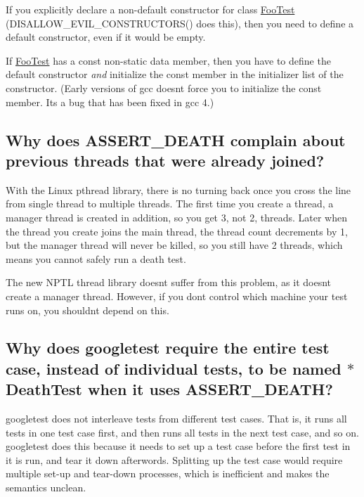 \begin{DoxyItemize}
\item If you explicitly declare a non-\/default constructor for class {\ttfamily \mbox{\hyperlink{class_foo_test}{Foo\+Test}}} ({\ttfamily D\+I\+S\+A\+L\+L\+O\+W\+\_\+\+E\+V\+I\+L\+\_\+\+C\+O\+N\+S\+T\+R\+U\+C\+T\+O\+R\+S()} does this), then you need to define a default constructor, even if it would be empty.
\item If {\ttfamily \mbox{\hyperlink{class_foo_test}{Foo\+Test}}} has a const non-\/static data member, then you have to define the default constructor {\itshape and} initialize the const member in the initializer list of the constructor. (Early versions of {\ttfamily gcc} doesn\textquotesingle{}t force you to initialize the const member. It\textquotesingle{}s a bug that has been fixed in {\ttfamily gcc 4}.)
\end{DoxyItemize}

\subsection*{Why does A\+S\+S\+E\+R\+T\+\_\+\+D\+E\+A\+TH complain about previous threads that were already joined?}

With the Linux pthread library, there is no turning back once you cross the line from single thread to multiple threads. The first time you create a thread, a manager thread is created in addition, so you get 3, not 2, threads. Later when the thread you create joins the main thread, the thread count decrements by 1, but the manager thread will never be killed, so you still have 2 threads, which means you cannot safely run a death test.

The new N\+P\+TL thread library doesn\textquotesingle{}t suffer from this problem, as it doesn\textquotesingle{}t create a manager thread. However, if you don\textquotesingle{}t control which machine your test runs on, you shouldn\textquotesingle{}t depend on this.

\subsection*{Why does googletest require the entire test case, instead of individual tests, to be named $\ast$\+Death\+Test when it uses A\+S\+S\+E\+R\+T\+\_\+\+D\+E\+A\+TH?}

googletest does not interleave tests from different test cases. That is, it runs all tests in one test case first, and then runs all tests in the next test case, and so on. googletest does this because it needs to set up a test case before the first test in it is run, and tear it down afterwords. Splitting up the test case would require multiple set-\/up and tear-\/down processes, which is inefficient and makes the semantics unclean.

